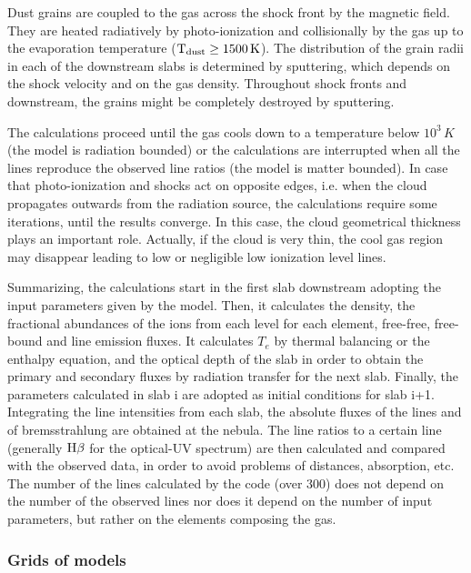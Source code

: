 \documentclass[../main.tex]{subfiles}
\begin{document}
Dust grains are coupled to the gas across the shock front by the magnetic field. 
They are heated radiatively by photo-ionization and collisionally by the gas up to the evaporation temperature ($\rm T_{\rm dust} \geq 1500\,\si{K}$). 
The distribution of the grain radii in each of the downstream slabs is determined by sputtering, which depends on the shock velocity and on the gas density. 
Throughout shock fronts and downstream, the grains might be completely destroyed by sputtering.

The calculations proceed until the gas cools down to a temperature below $10^3\,\si{K}$ (the model is radiation bounded) or the calculations are interrupted when all the lines reproduce the observed line ratios (the model is matter bounded).
In case that photo-ionization and shocks act on opposite edges, i.e. when the cloud propagates outwards from the 
radiation source, the calculations require some iterations, until the results converge.
In this case, the cloud geometrical thickness plays an important role.  
Actually, if the cloud is very thin, the cool gas region may disappear leading to low or negligible low ionization level lines. 

Summarizing, the calculations start in the first slab downstream adopting the input parameters given by the model.
Then, it calculates the density, the fractional abundances of the ions from each level for each element, free-free,  free-bound  and line emission fluxes. 
It calculates $T_e$ by thermal balancing or the enthalpy equation, and the optical depth of the slab in order to obtain the primary and secondary fluxes by radiation transfer for the next slab. 
Finally, the parameters  calculated in slab i are adopted as initial conditions for slab i+1. 
Integrating the line intensities from each slab, the absolute fluxes of the lines and of bremsstrahlung are obtained at the nebula. 
The line ratios to a certain line (generally $\rm H\beta$ for the optical-UV spectrum) are then calculated and compared with the observed data, in order to avoid problems of distances, absorption, etc.
The number of the lines calculated by the code (over 300) does not depend on the number of the observed lines nor does it depend on the number of  input parameters, but rather on the elements composing the gas.

\subsubsection{Grids of models}
\end{document}
